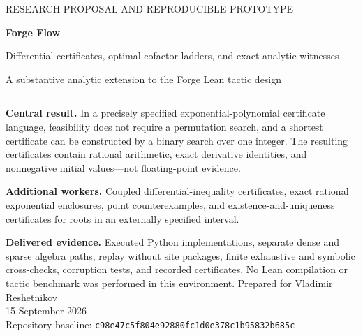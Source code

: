 \documentclass[11pt,a4paper]{article}
\newcommand{\code}[1]{{\urlstyle{tt}\nolinkurl{#1}}}
\newcommand{\forgecommit}{\code{c98e47c5f804e92880fc1d0e378c1b95832b685c}}
\theoremstyle{definition}
\theoremstyle{remark}
\begin{document}
\begin{titlepage}
\vspace*{12mm}
{\sffamily\small RESEARCH PROPOSAL AND REPRODUCIBLE PROTOTYPE\par}
\vspace{13mm}
{\sffamily\bfseries\Huge Forge Flow\par}
\vspace{5mm}
{\sffamily\LARGE Differential certificates, optimal cofactor ladders, and exact analytic witnesses\par}
\vspace{9mm}
{\large A substantive analytic extension to the Forge Lean tactic design\par}
\vspace{10mm}
\rule{\textwidth}{0.5pt}\par
\vspace{5mm}
\textbf{Central result.} In a precisely specified exponential-polynomial certificate language, feasibility does not require a permutation search, and a shortest certificate can be constructed by a binary search over one integer. The resulting certificates contain rational arithmetic, exact derivative identities, and nonnegative initial values---not floating-point evidence.\par
\vspace{5mm}

\textbf{Additional workers.} Coupled differential-inequality certificates, exact rational exponential enclosures, point counterexamples, and existence-and-uniqueness certificates for roots in an externally specified interval.\par
\vspace{5mm}

\textbf{Delivered evidence.} Executed Python implementations, separate dense and sparse algebra paths, replay without site packages, finite exhaustive and symbolic cross-checks, corruption tests, and recorded certificates. No Lean compilation or tactic benchmark was performed in this environment.
\vfill
Prepared for Vladimir Reshetnikov\\
15 September 2026\\[3mm]
Repository baseline: \forgecommit
\end{titlepage}
\end{document}
